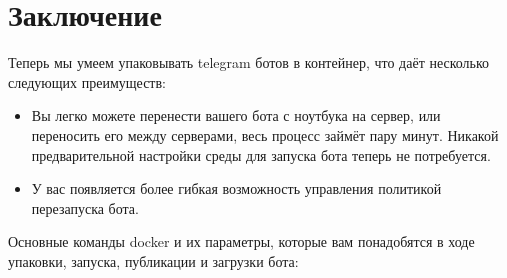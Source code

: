 \documentclass[
]{book}
\providecommand{\tightlist}{%
  \setlength{\itemsep}{0pt}\setlength{\parskip}{0pt}}
\begin{document}
\section{Заключение}\label{ux437ux430ux43aux43bux44eux447ux435ux43dux438ux435-7}

Теперь мы умеем упаковывать telegram ботов в контейнер, что даёт несколько следующих преимуществ:

\begin{itemize}
\tightlist
\item
  Вы легко можете перенести вашего бота с ноутбука на сервер, или переносить его между серверами, весь процесс займёт пару минут. Никакой предварительной настройки среды для запуска бота теперь не потребуется.
\item
  У вас появляется более гибкая возможность управления политикой перезапуска бота.
\end{itemize}

Основные команды docker и их параметры, которые вам понадобятся в ходе упаковки, запуска, публикации и загрузки бота:
\end{document}
